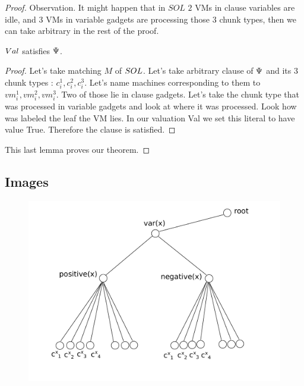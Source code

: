 \begin{proof}
Observation. It might happen that in $SOL$ $2$ VMs in
clause variables are idle, and $3$ VMs in variable gadgets are
processing those $3$ chunk types, then we can take arbitrary in the rest
of the proof.


\begin{lemma}$Val$ satisfies $\Psi$.
\end{lemma}
\begin{proof}
Let's take matching $M$ of $SOL$. Let's take arbitrary clause of
$\Psi$ and its $3$ chunk types 
: $c_i^1, c_i^2, c_i^3$. Let's name machines corresponding to them
to $vm_i^1, vm_i^2, vm_i^3$. Two of those lie in clause gadgets. Let's
take the chunk type that was processed in variable
gadgets and look at where it was processed. Look how was labeled the
leaf the VM lies. In our valuation Val we set this literal to have
value True. Therefore the clause is satisfied.
\end{proof}

This last lemma proves our theorem.
\end{proof}
\subsection{Images}

\begin{figure}[htbp]
\includegraphics[width = \columnwidth]{figs/gadget-no-bw.pdf}
\end{figure}


